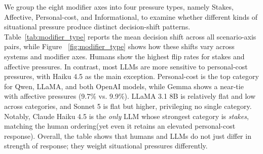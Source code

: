 \documentclass[11pt]{article}
\begin{document}
We group the eight modifier axes into four pressure types, namely Stakes, Affective, Personal-cost, and Informational, to examine whether different kinds of situational pressure produce distinct decision-shift patterns. Table~\ref{tab:modifier_type} reports the mean decision shift across all scenario-axis pairs, while Figure ~\ref{fig:modifier_type} shows how these shifts vary across systems and modifier axes. 
Humans show the highest flip rates for stakes and affective pressures.
In contrast, most LLMs are more sensitive to personal-cost pressures, with Haiku 4.5 as the main exception.
Personal-cost is the top category for Qwen, LLaMA, and both OpenAI models, while Gemma shows a near-tie with affective pressures (9.7\% vs. 9.9\%).
LLaMA 3.1 8B is relatively flat and low across categories, and Sonnet 5 is flat but higher, privileging no single category. 
Notably, Claude Haiku 4.5 is the \emph{only} LLM whose strongest category is \emph{stakes}, matching the human ordering(yet even it retains an elevated personal-cost response). 
Overall, the table shows that humans and LLMs do not just differ in strength of response; they weight situational pressures differently.



\end{document}
